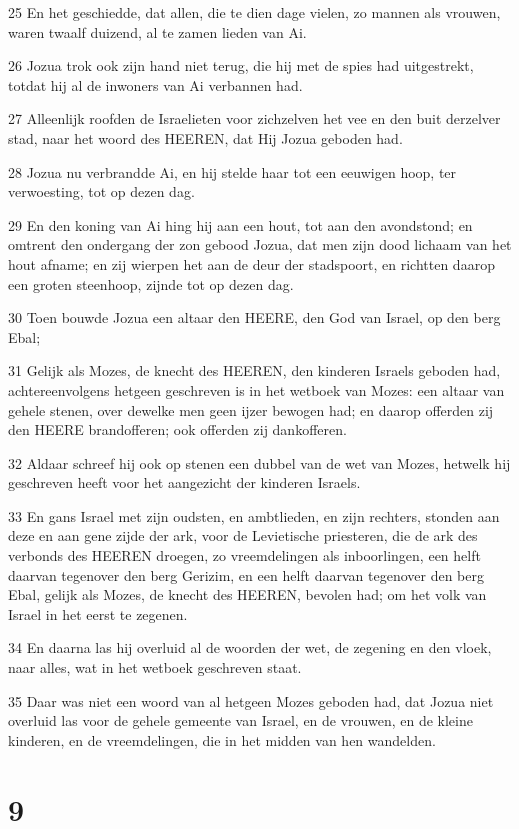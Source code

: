 \par 25 En het geschiedde, dat allen, die te dien dage vielen, zo mannen als vrouwen, waren twaalf duizend, al te zamen lieden van Ai.
\par 26 Jozua trok ook zijn hand niet terug, die hij met de spies had uitgestrekt, totdat hij al de inwoners van Ai verbannen had.
\par 27 Alleenlijk roofden de Israelieten voor zichzelven het vee en den buit derzelver stad, naar het woord des HEEREN, dat Hij Jozua geboden had.
\par 28 Jozua nu verbrandde Ai, en hij stelde haar tot een eeuwigen hoop, ter verwoesting, tot op dezen dag.
\par 29 En den koning van Ai hing hij aan een hout, tot aan den avondstond; en omtrent den ondergang der zon gebood Jozua, dat men zijn dood lichaam van het hout afname; en zij wierpen het aan de deur der stadspoort, en richtten daarop een groten steenhoop, zijnde tot op dezen dag.
\par 30 Toen bouwde Jozua een altaar den HEERE, den God van Israel, op den berg Ebal;
\par 31 Gelijk als Mozes, de knecht des HEEREN, den kinderen Israels geboden had, achtereenvolgens hetgeen geschreven is in het wetboek van Mozes: een altaar van gehele stenen, over dewelke men geen ijzer bewogen had; en daarop offerden zij den HEERE brandofferen; ook offerden zij dankofferen.
\par 32 Aldaar schreef hij ook op stenen een dubbel van de wet van Mozes, hetwelk hij geschreven heeft voor het aangezicht der kinderen Israels.
\par 33 En gans Israel met zijn oudsten, en ambtlieden, en zijn rechters, stonden aan deze en aan gene zijde der ark, voor de Levietische priesteren, die de ark des verbonds des HEEREN droegen, zo vreemdelingen als inboorlingen, een helft daarvan tegenover den berg Gerizim, en een helft daarvan tegenover den berg Ebal, gelijk als Mozes, de knecht des HEEREN, bevolen had; om het volk van Israel in het eerst te zegenen.
\par 34 En daarna las hij overluid al de woorden der wet, de zegening en den vloek, naar alles, wat in het wetboek geschreven staat.
\par 35 Daar was niet een woord van al hetgeen Mozes geboden had, dat Jozua niet overluid las voor de gehele gemeente van Israel, en de vrouwen, en de kleine kinderen, en de vreemdelingen, die in het midden van hen wandelden.

\chapter{9}

